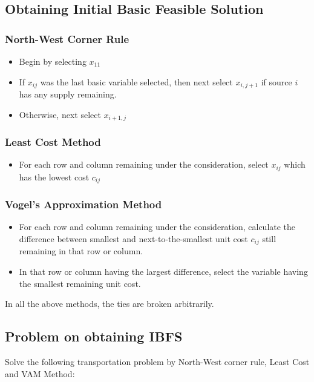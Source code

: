 \documentclass[12pt]{article}
\begin{document}
\subsection{Obtaining Initial Basic Feasible Solution}
\subsubsection*{North-West Corner Rule}
\begin{itemize}
\item Begin by selecting $x_{11}$ 
\item If $x_{ij}$ was the last basic variable selected, then next select $x_{i,j+1}$ if source $i$ has any supply remaining.
\item Otherwise, next select $x_{i+1,j}$
\end{itemize}

\subsubsection*{Least Cost Method}
\begin{itemize}
\item For each row and column remaining under the consideration, select $x_{ij}$ which has the lowest cost $c_{ij}$ 
\end{itemize}

\subsubsection*{Vogel's Approximation Method}
\begin{itemize}
\item For each row and column remaining under the consideration, calculate the difference between smallest and next-to-the-smallest unit cost $c_{ij}$ still remaining in that row or column. 
\item In that row or column having the largest difference, select the variable having the smallest remaining unit cost.
\end{itemize}

In all the above methods, the ties are broken arbitrarily.

\subsection{Problem on obtaining IBFS}

Solve the following transportation problem by North-West corner rule, Least Cost and VAM Method:
\end{document}
